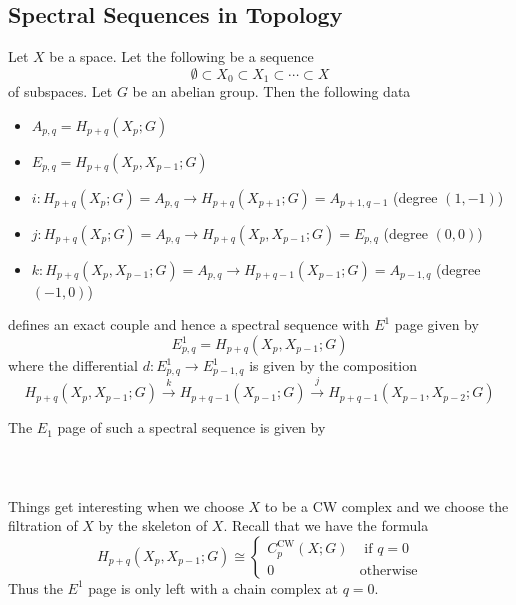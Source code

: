 \documentclass[a4paper]{article}
\begin{document}
\subsection{Spectral Sequences in Topology}
\begin{thm}{}{} Let $X$ be a space. Let the following be a sequence $$\emptyset\subset X_0\subset X_1\subset\cdots\subset X$$ of subspaces. Let $G$ be an abelian group. Then the following data
\begin{itemize}
\item $A_{p,q}=H_{p+q}(X_p;G)$
\item $E_{p,q}=H_{p+q}(X_p,X_{p-1};G)$
\item $i:H_{p+q}(X_p;G)=A_{p,q}\to H_{p+q}(X_{p+1};G)=A_{p+1,q-1}$ (degree $(1,-1)$)
\item $j:H_{p+q}(X_p;G)=A_{p,q}\to H_{p+q}(X_p,X_{p-1};G)=E_{p,q}$ (degree $(0,0)$)
\item $k:H_{p+q}(X_p,X_{p-1};G)=A_{p,q}\to H_{p+q-1}(X_{p-1};G)=A_{p-1,q}$ (degree $(-1,0)$)
\end{itemize}
defines an exact couple and hence a spectral sequence with $E^1$ page given by $$E_{p,q}^1=H_{p+q}(X_p,X_{p-1};G)$$ where the differential $d:E_{p,q}^1\to E_{p-1,q}^1$ is given by the composition $$H_{p+q}(X_p,X_{p-1};G)\overset{k}{\longrightarrow}H_{p+q-1}(X_{p-1};G)\overset{j}{\longrightarrow} H_{p+q-1}(X_{p-1},X_{p-2};G)$$
\end{thm}

The $E_1$ page of such a spectral sequence is given by \\~\\
\\~\\

Things get interesting when we choose $X$ to be a CW complex and we choose the filtration of $X$ by the skeleton of $X$. Recall that we have the formula $$H_{p+q}(X_p,X_{p-1};G)\cong\begin{cases}
C_p^\text{CW}(X;G) & \text{ if } q=0\\
0 & \text{otherwise}
\end{cases}$$ Thus the $E^1$ page is only left with a chain complex at $q=0$. 
\end{document}
